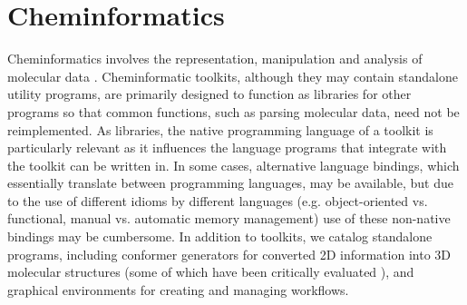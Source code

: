 \section{Cheminformatics}
 
Cheminformatics involves the representation, manipulation and analysis of molecular data \cite{Leach_2007,Gasteiger_2003}. Cheminformatic toolkits, although they may contain standalone utility programs, are primarily designed to function as libraries for other programs so that common functions, such as parsing molecular data, need not be reimplemented.  As libraries, the native programming language of a toolkit is particularly relevant as it influences the language programs that integrate with the toolkit can be written in.  In some cases, alternative language bindings, which essentially translate between programming languages, may be available, but due to the use of different idioms by different languages (e.g. object-oriented vs. functional, manual vs. automatic memory management) use of these non-native bindings may be cumbersome.  In addition to toolkits, we catalog standalone programs, including conformer generators for converted 2D information into 3D molecular structures (some of which have been critically evaluated \cite{Ebejer_2012}), and graphical environments for creating and managing workflows.